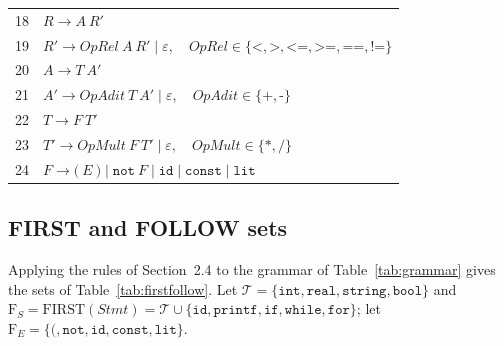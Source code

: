 \documentclass[11pt,a4paper]{article}
\newcommand{\eps}{\varepsilon}
\newcommand{\nt}[1]{\textit{#1}}
\newcommand{\tk}[1]{\texttt{#1}}
\begin{document}
\begin{longtable}{@{}rl@{}}
18 & $\nt{R}\to\nt{A}\ \nt{R}'$\\
19 & $\nt{R}'\to\nt{OpRel}\ \nt{A}\ \nt{R}'\mid\eps,\quad \nt{OpRel}\in\{\tk{<},\tk{>},\tk{<=},\tk{>=},\tk{==},\tk{!=}\}$\\
20 & $\nt{A}\to\nt{T}\ \nt{A}'$\\
21 & $\nt{A}'\to\nt{OpAdit}\ \nt{T}\ \nt{A}'\mid\eps,\quad \nt{OpAdit}\in\{\tk{+},\tk{-}\}$\\
22 & $\nt{T}\to\nt{F}\ \nt{T}'$\\
23 & $\nt{T}'\to\nt{OpMult}\ \nt{F}\ \nt{T}'\mid\eps,\quad \nt{OpMult}\in\{\tk{*},\tk{/}\}$\\
24 & $\nt{F}\to\tk{(}\ \nt{E}\ \tk{)}\mid\tk{not}\ \nt{F}\mid\tk{id}\mid\tk{const}\mid\tk{lit}$\\
\end{longtable}

\subsection{FIRST and FOLLOW sets}
Applying the rules of Section~2.4 to the grammar of Table~\ref{tab:grammar} gives the sets of Table~\ref{tab:firstfollow}. Let $\mathcal{T}=\{\tk{int},\tk{real},\tk{string},\tk{bool}\}$ and $\mathrm{F}_S=\mathrm{FIRST}(\nt{Stmt})=\mathcal{T}\cup\{\tk{id},\tk{printf},\tk{if},\tk{while},\tk{for}\}$; let $\mathrm{F}_E=\{\tk{(},\tk{not},\tk{id},\tk{const},\tk{lit}\}$.
\end{document}
